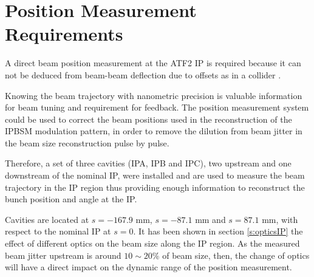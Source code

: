 {{\section{Position Measurement Requirements}
A direct beam position measurement at the ATF2 IP is required because it can not be deduced from beam-beam deflection due to offsets as in a collider \cite{Bambade:1989pb}.\par
Knowing the beam trajectory with nanometric precision is valuable information for beam tuning and requirement for feedback. The position measurement system could be used to correct the beam positions used in the reconstruction of the IPBSM modulation pattern, in order to remove the dilution from beam jitter in the beam size reconstruction pulse by pulse.\par
Therefore, a set of three cavities (IPA, IPB and IPC), two upstream and one downstream of the nominal IP, were installed and are used to measure the beam trajectory in the IP region thus providing enough information to reconstruct the bunch position and angle at the IP.\par
Cavities are located at $s=-167.9$ mm, $s=-87.1$ mm and $s=87.1$ mm, with respect to the nominal IP at $s=0$. It has been shown in section \ref{s:opticsIP} the effect of different optics on the beam size along the IP region. As the measured beam jitter upstream is around $10\sim20$\% of beam size, then, the change of optics will have a direct impact on the dynamic range of the position measurement.\par %
}}
